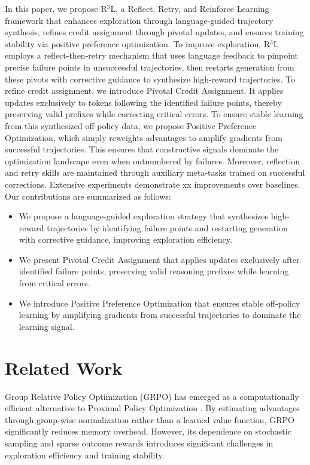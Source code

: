 \documentclass[11pt]{article}
\begin{document}
In this paper, we propose R$^3$L, a Reflect, Retry, and Reinforce Learning framework that enhances exploration through language-guided trajectory synthesis, refines credit assignment through pivotal updates, and ensures training stability via positive preference optimization. To improve exploration, R$^3$L employs a reflect-then-retry mechanism that uses language feedback to pinpoint precise failure points in unsuccessful trajectories, then restarts generation from these pivots with corrective guidance to synthesize high-reward trajectories. To refine credit assignment, we introduce Pivotal Credit Assignment. It applies updates exclusively to tokens following the identified failure points, thereby preserving valid prefixes while correcting critical errors. To ensure stable learning from this synthesized off-policy data, we propose Positive Preference Optimization, which simply reweights advantages to amplify gradients from successful trajectories. This ensures that constructive signals dominate the optimization landscape even when outnumbered by failures. Moreover, reflection and retry skills are maintained through auxiliary meta-tasks trained on successful corrections. Extensive experiments demonstrate xx improvements over baselines. Our contributions are summarized as follows:
\begin{itemize}
    \item We propose a language-guided exploration strategy that synthesizes high-reward trajectories by identifying failure points and restarting generation with corrective guidance, improving exploration efficiency.
    \item We present Pivotal Credit Assignment that applies updates exclusively after identified failure points, preserving valid reasoning prefixes while learning from critical errors.
    \item We introduce Positive Preference Optimization that ensures stable off-policy learning by amplifying gradients from successful trajectories to dominate the learning signal.
\end{itemize}



\section{Related Work}
Group Relative Policy Optimization (GRPO) \cite{shao2024deepseekmath} has emerged as a computationally efficient alternative to Proximal Policy Optimization \cite{schulman2017proximal}. By estimating advantages through group-wise normalization rather than a learned value function, GRPO significantly reduces memory overhead. However, its dependence on stochastic sampling and sparse outcome rewards introduces significant challenges in exploration efficiency and training stability.
\end{document}
